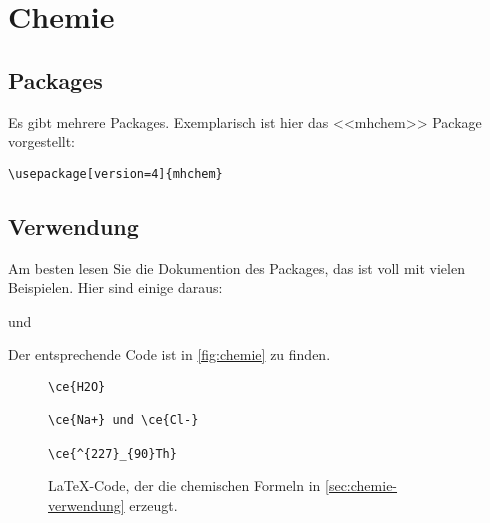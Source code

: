 \chapter{Chemie}\label{sec:chemie}


\section{Packages}
Es gibt mehrere Packages. Exemplarisch ist hier das <<mhchem>>\cite{mhchem}
Package vorgestellt:

\begin{verbatim}
\usepackage[version=4]{mhchem}
\end{verbatim}

\section{Verwendung} \label{sec:chemie-verwendung}
Am besten lesen Sie die Dokumention des Packages, das ist voll mit vielen
Beispielen. Hier sind einige daraus:


 und 


Der entsprechende Code ist in \autoref{fig:chemie} zu finden.

\begin{figure}[ht]
\centering
\begin{minipage}{0.8\textwidth}
\begin{verbatim}
\ce{H2O}

\ce{Na+} und \ce{Cl-}

\ce{^{227}_{90}Th}
\end{verbatim}
\end{minipage}
\caption{\LaTeX{}-Code, der die chemischen Formeln in
	\autoref{sec:chemie-verwendung}
erzeugt.}
\label{fig:chemie}
\end{figure}
